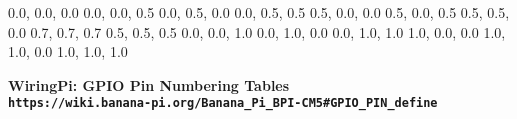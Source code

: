 \documentclass[11pt,a4paper]{article}
\begin{document}
\begin{sffamily}
\definecolor{rtb-black}{rgb}  {0.0, 0.0, 0.0}
\definecolor{rtb-navy}{rgb}   {0.0, 0.0, 0.5}
\definecolor{rtb-green}{rgb}  {0.0, 0.5, 0.0}
\definecolor{rtb-teal}{rgb}   {0.0, 0.5, 0.5}
\definecolor{rtb-maroon}{rgb} {0.5, 0.0, 0.0}
\definecolor{rtb-purple}{rgb} {0.5, 0.0, 0.5}
\definecolor{rtb-olive}{rgb}  {0.5, 0.5, 0.0}
\definecolor{rtb-silver}{rgb} {0.7, 0.7, 0.7}
\definecolor{rtb-grey}{rgb}   {0.5, 0.5, 0.5}
\definecolor{rtb-blue}{rgb}   {0.0, 0.0, 1.0}
\definecolor{rtb-lime}{rgb}   {0.0, 1.0, 0.0}
\definecolor{rtb-aqua}{rgb}   {0.0, 1.0, 1.0}
\definecolor{rtb-red}{rgb}    {1.0, 0.0, 0.0}
\definecolor{rtb-yellow}{rgb} {1.0, 1.0, 0.0}
\definecolor{rtb-white}{rgb}  {1.0, 1.0, 1.0}

\begin{center}
\bfseries{WiringPi: GPIO Pin Numbering Tables}\\
\tt{https://wiki.banana-pi.org/Banana_Pi_BPI-CM5#GPIO_PIN_define}
\end{center}


\end{sffamily}
\end{document}
